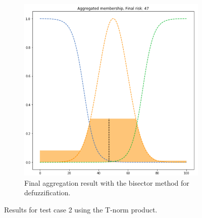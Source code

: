 \begin{figure}[ht]
\begin{subfigure}{.5\textwidth}
  \centering
  \includegraphics[width=.8\linewidth]{figures/second/prod-bisector.png}  
  \caption{Final aggregation result with the bisector method for defuzzification.}
  \label{fig:2prod-bisector}
\end{subfigure}
\caption{Results for test case 2 using the T-norm product.}
\label{fig:testcase2prod}
\end{figure}
